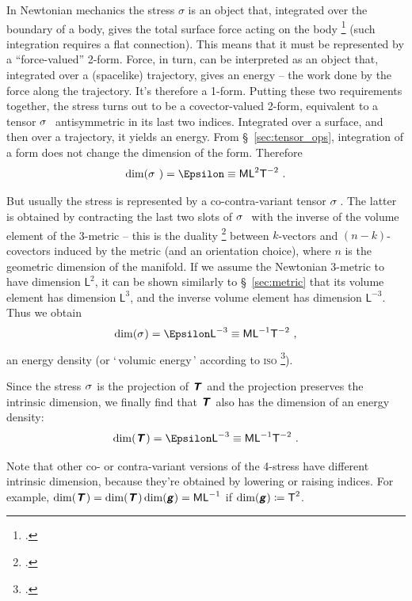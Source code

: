 \documentclass[\ifafour a4paper,12pt,\else a5paper,10pt,\fi%
onecolumn,oneside,article,%
british%
]{memoir}
\makeatletter
\newcommand*{\defquote}[1]{`\,#1\,'}
\theoremstyle{remark}
\theoremstyle{innote}
\newcommand*{\mathte}[1]{\textbf{\textit{\textsf{#1}}}}
\newcommand*{\citep}{\footcites}
\newcommand*{\defd}{\coloneqq}
\renewcommand*{\|}[1][]{\nonscript\,#1\vert\nonscript\;\mathopen{}}
\newcommand*{\sect}{\S}%
\newcommand*{\chap}{ch.}%
\newcommand*{\q}{}%
\DeclareRobustCommand*{\q}{%
  \mathbin{\mathpalette\bigcdot@{}}%
}
\newcommand*{\bigcdot@scalefactor}{0.7}
\newcommand*{\bigcdot@widthfactor}{1.5}
\newcommand*{\bigcdot@}[2]{%
  \sbox0{$#1\vcenter{}$}%
  \sbox2{$#1\cdot\m@th$}%
  \hbox to \bigcdot@widthfactor\wd2{%
    \hfil
    \raise\ht0\hbox{%
      \scalebox{\bigcdot@scalefactor}{%
        \lower\ht0\hbox{$#1\bullet\m@th$}%
      }%
    }%
    \hfil
  }%
}
\newcommand*{\Le}{\textsf{L}}
\newcommand*{\Ti}{\textsf{T}}
\newcommand*{\Ma}{\textsf{M}}
\newcommand*{\En}{\Epsilon}%
\newcommand*{\yg}{\mathte{g}}
\newcommand*{\yT}{\mathte{T}}
\renewcommand*{\i}{\indices}
\newcommand*{\yt}{\sigma}
\makeatother
\begin{document}
In Newtonian mechanics the stress $\yt$ is an object that, integrated over
the boundary of a body, gives the total surface force acting on the body
\citep[\chap~III]{truesdell1977_r1991} (such integration requires a flat
connection). This means that it must be represented by a
\enquote{force-valued} 2-form. Force, in turn, can be interpreted as an
object that, integrated over a (spacelike) trajectory, gives an energy --
the work done by the force along the trajectory. It's therefore a 1-form.
Putting these two requirements together, the stress turns out to be a
covector-valued 2-form, equivalent to a tensor $\yt\i{_{\q\ \q\q}}$
antisymmetric in its last two indices. Integrated over a surface, and then
over a trajectory, it yields an energy. From \sect~\ref{sec:tensor_ops},
integration of a form does not change the dimension of the form. Therefore
\begin{equation}
  \label{eq:dim_3stress_form}
  \dim(\yt\i{_{\q\ \q\q}}) = \En \equiv \Ma\Le^{2}\Ti^{-2} \ .
\end{equation}

But usually the stress is represented by a co-contra-variant tensor
$\yt\i{_{\q}^{\q}}$\,. The latter is obtained by contracting the last two
slots of $\yt\i{_{\q\ \q\q}}$ with the inverse of the volume element of the
3-metric -- this is the duality \citep[\sect~4.1.2]{bossavit1991} between
$k$-vectors and $(n-k)$-covectors induced by the metric (and an orientation
choice), where $n$ is the geometric dimension of the manifold. If we assume
the Newtonian 3-metric to have dimension $\Le^{2}$, it can be shown
similarly to \sect~\ref{sec:metric} that its volume element has dimension
$\Le^{3}$, and the inverse volume element has dimension $\Le^{-3}$. Thus we
obtain
\begin{equation}
  \label{eq:dim_3stress}
  \dim(\yt\i{_{\q}^{\q}}) = \En\Le^{-3} \equiv \Ma\Le^{-1}\Ti^{-2} \ ,
\end{equation}
an energy density (or \defquote{volumic energy} according to \textsc{iso}
\citep[item~A.6.2]{iso2009}).

Since the stress $\yt\i{_{\q}^{\q}}$ is the projection of
$\yT\i{_{\q}^{\q}}$ and the projection preserves the intrinsic dimension, we
finally find that $\yT\i{_{\q}^{\q}}$ also has the dimension of an energy density:
\begin{equation}
  \label{eq:dim_4stress}
  \dim(\yT\i{_{\q}^{\q}}) = \En\Le^{-3} \equiv \Ma\Le^{-1}\Ti^{-2} \ .
\end{equation}

Note that other co- or contra-variant versions of the 4-stress  have
different intrinsic dimension, because they're obtained by lowering or
raising indices. For example,
$\dim(\yT\i{_{\q\q}})=\dim(\yT\i{_{\q}^{\q}})\dim(\yg)=\Ma\Le^{-1}$ if
$\dim(\yg)\defd \Ti^{2}$.
\end{document}
